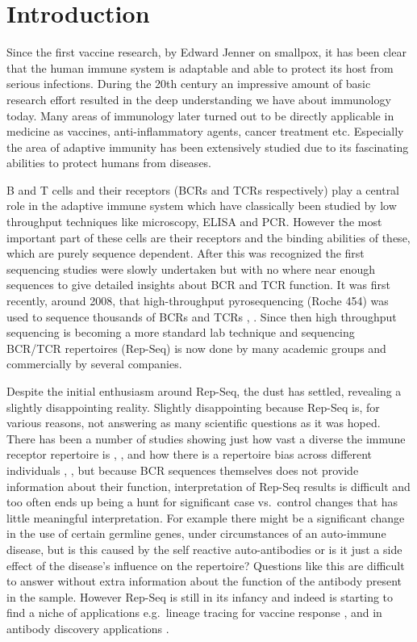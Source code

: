 \chapter{Introduction}
Since the first vaccine research, by Edward Jenner on smallpox, it has been clear that the human immune system is adaptable and able to protect its host from serious infections.
During the 20th century an impressive amount of basic research effort resulted in the deep understanding we have about immunology today.
Many areas of immunology later turned out to be directly applicable in medicine as vaccines, anti-inflammatory agents, cancer treatment etc.
Especially the area of adaptive immunity has been extensively studied due to its fascinating abilities to protect humans from diseases.

B and T cells and their receptors (BCRs and TCRs respectively) play a central role in the adaptive immune system which have classically been studied by low throughput techniques like microscopy, ELISA and PCR.
However the most important part of these cells are their receptors and the binding abilities of these, which are purely sequence dependent.
After this was recognized the first sequencing studies were slowly undertaken but with no where near enough sequences to give detailed insights about BCR and TCR function.
It was first recently, around 2008, that high-throughput pyrosequencing (Roche 454) was used to sequence thousands of BCRs and TCRs \cite{campbell2008subclonal}, \cite{boyd2008high}.
Since then high throughput sequencing is becoming a more standard lab technique and sequencing BCR/TCR repertoires (Rep-Seq) is now done by many academic groups and commercially by several companies.

Despite the initial enthusiasm around Rep-Seq, the dust has settled, revealing a slightly disappointing reality.
Slightly disappointing because Rep-Seq is, for various reasons, not answering as many scientific questions as it was hoped.
There has been a number of studies showing just how vast a diverse the immune receptor repertoire is \cite{zhang20173d}, \cite{elhanati2015inferring}, and how there is a repertoire bias across different individuals \cite{dewitt2016public}, \cite{vander2017dysregulation}, but because BCR sequences themselves does not provide information about their function, interpretation of Rep-Seq results is difficult and too often ends up being a hunt for significant case vs.\ control changes that has little meaningful interpretation.
For example there might be a significant change in the use of certain germline genes, under circumstances of an auto-immune disease, but is this caused by the self reactive auto-antibodies or is it just a side effect of the disease's influence on the repertoire?
Questions like this are difficult to answer without extra information about the function of the antibody present in the sample.
However Rep-Seq is still in its infancy and indeed is starting to find a niche of applications e.g.\ lineage tracing for vaccine response \cite{Doria-Rose2014-vi}, \cite{Wu2011-yj} and in antibody discovery applications \cite{reddy2010monoclonal}.


